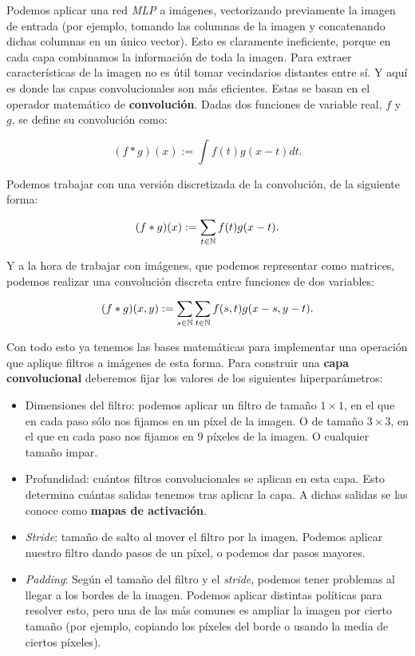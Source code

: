 Podemos aplicar una red \textit{MLP} a imágenes, vectorizando previamente la imagen de entrada (por ejemplo, tomando las columnas de la imagen y concatenando dichas columnas en un único vector). Esto es claramente ineficiente, porque en cada capa combinamos la información de toda la imagen. Para extraer características de la imagen no es útil tomar vecindarios distantes entre sí. Y aquí es donde las capas convolucionales son más eficientes. Estas se basan en el operador matemático de \textbf{convolución}. Dadas dos funciones de variable real, $f$ y $g$, se define su convolución como:

\begin{equation}
	(f * g)(x) := \int f(t) g(x - t) dt.
\end{equation}

Podemos trabajar con una versión discretizada de la convolución, de la siguiente forma:

\begin{equation}
	(f * g)(x) := \sum_{t \in \mathbb{N}} f(t) g(x - t).
\end{equation}

Y a la hora de trabajar con imágenes, que podemos representar como matrices, podemos realizar una convolución discreta entre funciones de dos variables:

\begin{equation}
	(f * g)(x, y) := \sum_{s \in \mathbb{N}} \sum_{t \in \mathbb{N}} f(s, t) g(x - s, y - t).
\end{equation}

Con todo esto ya tenemos las bases matemáticas para implementar una operación que aplique filtros a imágenes de esta forma. Para construir una \textbf{capa convolucional} deberemos fijar los valores de los siguientes hiperparámetros:

\begin{itemize}
	\item Dimensiones del filtro: podemos aplicar un filtro de tamaño $1 \times 1$, en el que en cada paso sólo nos fijamos en un píxel de la imagen. O de tamaño $3 \times 3$, en el que en cada paso nos fijamos en 9 píxeles de la imagen. O cualquier tamaño impar.
	\item Profundidad: cuántos filtros convolucionales se aplican en esta capa. Esto determina cuántas salidas tenemos tras aplicar la capa. A dichas salidas se las conoce como \textbf{mapas de activación}.
	\item \textit{Stride}: tamaño de salto al mover el filtro por la imagen. Podemos aplicar nuestro filtro dando pasos de un píxel, o podemos dar pasos mayores.
	\item \textit{Padding}: Según el tamaño del filtro y el \textit{stride}, podemos tener problemas al llegar a los bordes de la imagen. Podemos aplicar distintas políticas para resolver esto, pero una de las más comunes es ampliar la imagen por cierto tamaño (por ejemplo, copiando los píxeles del borde o usando la media de ciertos píxeles).
\end{itemize}

